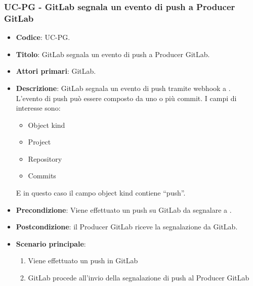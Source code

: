 \subsubsection{UC\theuccount-PG - GitLab segnala un evento di push a Producer GitLab}
	\begin{itemize}
		\item \textbf{Codice}: UC\theuccount-PG.
		\item \textbf{Titolo}: GitLab segnala un evento di push a Producer GitLab.
		\item \textbf{Attori primari}: GitLab.
		\item \textbf{Descrizione}: GitLab segnala un evento di push tramite webhook a \progetto. L'evento di	push può essere composto da uno o più commit.
		I campi di interesse sono:
		\begin{itemize}
			\item Object kind
			\item Project
			\item Repository
			\item Commits
		\end{itemize}
		E in questo caso il campo object kind contiene ``push''.
		\item \textbf{Precondizione}: Viene effettuato un push su GitLab da segnalare a \progetto.
		\item \textbf{Postcondizione}: il Producer GitLab riceve la segnalazione da GitLab.
		\item \textbf{Scenario principale}: 
		\begin{enumerate}
			\item Viene effettuato un push in GitLab
			\item GitLab procede all'invio della segnalazione di push al Producer GitLab
		\end{enumerate}
		
	\end{itemize}